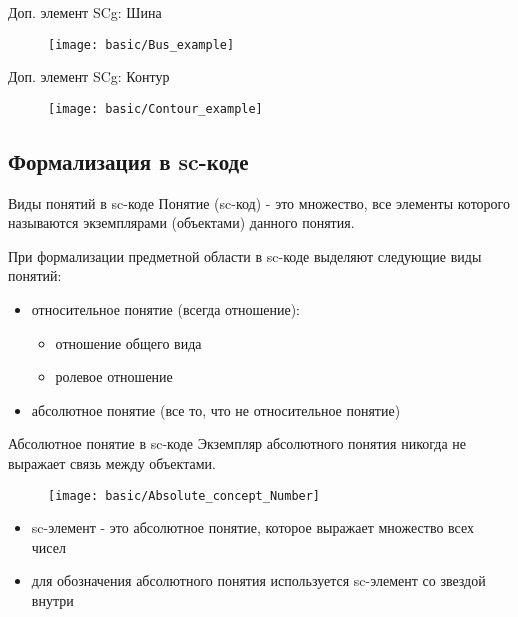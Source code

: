 \begin{frame}{Доп. элемент SCg: Шина}
  \begin{center}
    \begin{figure}
      \texttt{[image: basic/Bus\_example]}
    \end{figure}
  \end{center}
\end{frame}

\begin{frame}{Доп. элемент SCg: Контур}
  \begin{center}
    \begin{figure}
      \texttt{[image: basic/Contour\_example]}
    \end{figure}
  \end{center}
\end{frame}

\subsection{Формализация в sc-коде}

\begin{frame}{Виды понятий в sc-коде}
  Понятие (sc-код) - это множество, все элементы которого называются
  экземплярами (объектами) данного понятия.


  При формализации предметной области в sc-коде выделяют следующие
  виды понятий:
  \begin{itemize}
  \item относительное понятие (всегда отношение):
    \begin{itemize}
    \item отношение общего вида
    \item ролевое отношение
    \end{itemize}
  \item абсолютное понятие (все то, что не относительное понятие)
  \end{itemize}
\end{frame}

\begin{frame}{Абсолютное понятие в sc-коде}
  Экземпляр абсолютного понятия никогда не выражает связь между объектами.
  
  \begin{center}
    \begin{figure}
      \texttt{[image: basic/Absolute\_concept\_Number]}
    \end{figure}
  \end{center}

  \begin{itemize}
  \item sc-элемент  - это абсолютное понятие, которое
    выражает множество всех чисел
  \item для обозначения абсолютного понятия используется sc-элемент со
    звездой внутри
  \end{itemize}
\end{frame}


